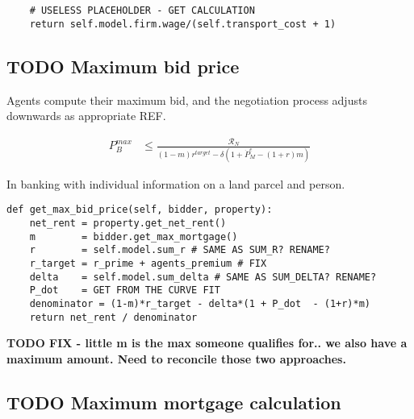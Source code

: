{\begin{lstlisting}
    # USELESS PLACEHOLDER - GET CALCULATION
    return self.model.firm.wage/(self.transport_cost + 1) 
\end{lstlisting}


\subsection{TODO Maximum bid price}

Agents compute their maximum bid, and the negotiation process adjusts downwards as appropriate REF.

\begin{eqnarray}
P_B^{max} & \le    \frac{\mathcal{R}_N}{(1-m)r^{target}-\delta \left(1 + \dot P_M^e - (1+r)m\right)} \label{eqn-bid-price} \end{eqnarray}

In banking with individual information on a land parcel and person.
\begin{lstlisting}
def get_max_bid_price(self, bidder, property):
    net_rent = property.get_net_rent()
    m        = bidder.get_max_mortgage()
    r        = self.model.sum_r # SAME AS SUM_R? RENAME?
    r_target = r_prime + agents_premium # FIX
    delta    = self.model.sum_delta # SAME AS SUM_DELTA? RENAME?
    P_dot    = GET FROM THE CURVE FIT
    denominator = (1-m)*r_target - delta*(1 + P_dot  - (1+r)*m)
    return net_rent / denominator   
\end{lstlisting}

\textbf{TODO FIX - little m is the max someone qualifies for.. we also have a maximum amount. Need to reconcile those two approaches.}
 
\subsection{TODO Maximum mortgage calculation}


}
